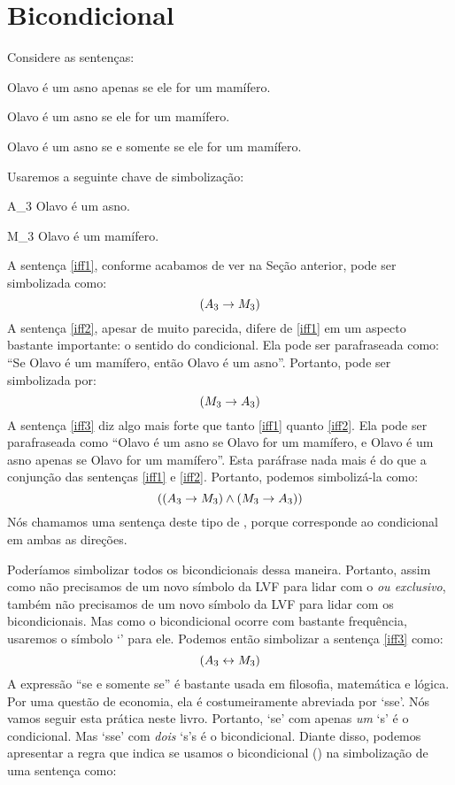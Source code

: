 \section{Bicondicional}
Considere as sentenças:
	\begin{earg}
		\item[\ex{iff1}] Olavo é um asno apenas se ele for um mamífero.
		\item[\ex{iff2}] Olavo é um asno se ele for um mamífero.
		\item[\ex{iff3}] Olavo é um asno se e somente se ele for um mamífero.
	\end{earg}
Usaremos a seguinte chave de simbolização:
	\begin{ekey}
		\item[A_3] Olavo é um asno.
		\item[M_3] Olavo é um mamífero.
	\end{ekey}
A sentença \ref{iff1}, conforme acabamos de ver na Seção anterior, pode ser simbolizada como:
$$(A_3 \rightarrow M_3)$$
A sentença \ref{iff2}, apesar de muito parecida, difere de \ref{iff1} em um aspecto bastante importante:
o sentido do condicional.
Ela pode ser parafraseada como:
``Se Olavo é um mamífero, então Olavo é um asno''.
Portanto, pode ser simbolizada por:
$$(M_3 \rightarrow A_3)$$
A sentença \ref{iff3} diz algo mais forte que tanto \ref{iff1} quanto \ref{iff2}.
Ela pode ser parafraseada como ``Olavo é um asno se Olavo for um mamífero, e Olavo é um asno apenas se Olavo for um mamífero''.
Esta paráfrase nada mais é do que a conjunção das sentenças \ref{iff1} e \ref{iff2}.
Portanto, podemos simbolizá-la como:
$$((A_3 \rightarrow M_3) \wedge (M_3 \rightarrow A_3))$$
Nós chamamos uma sentença deste tipo de , porque corresponde ao condicional em ambas as direções.

Poderíamos simbolizar todos os bicondicionais dessa maneira.
Portanto, assim como não precisamos de um novo símbolo da LVF para lidar com o \emph{ou exclusivo}, também não precisamos de um novo símbolo da LVF para lidar com os bicondicionais.
Mas como o bicondicional ocorre com bastante frequência, usaremos o símbolo `\eiff' para ele.
Podemos então simbolizar a sentença \ref{iff3} como:
$$(A_3 \leftrightarrow M_3)$$
A expressão ``se e somente se'' é bastante usada em filosofia, matemática e lógica.
Por uma questão de economia, ela é costumeiramente abreviada por `sse'.
Nós vamos seguir esta prática neste livro.
Portanto, `se' com apenas \emph {um} `s' é o condicional.
Mas `sse' com \emph{dois} `s's é o bicondicional.
Diante disso, podemos apresentar a regra que indica se usamos o bicondicional (\eiff) na simbolização de uma sentença como:


